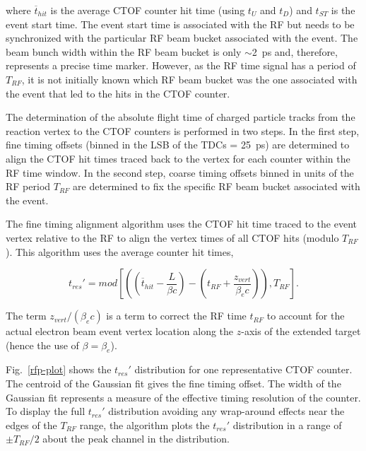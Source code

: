 \documentclass{elsart}
\begin{document}
\noindent
where $\overline{t}_{hit}$ is the average CTOF counter hit time (using $t_U$ and $t_D$) and $t_{ST}$
is the event start time. The event start time is associated with the RF but needs to be synchronized
with the particular RF beam bucket associated with the event. The beam bunch width within the RF beam
bucket is only $\sim$2~ps and, therefore, represents a precise time marker. However, as the RF time
signal has a period of $T_{RF}$, it is not initially known which RF beam bucket was the one associated with
the event that led to the hits in the CTOF counter.

The determination of the absolute flight time of charged particle tracks from the reaction vertex
to the CTOF counters is performed in two steps. In the first step, fine timing offsets (binned in the
LSB of the TDCs = 25~ps) are determined to align the CTOF hit times traced back to the vertex for
each counter within the RF time window. In the second step, coarse timing offsets binned in units of the
RF period $T_{RF}$ are determined to fix the specific RF beam bucket associated with the event.

The fine timing alignment algorithm uses the CTOF hit time traced to the event vertex relative to the RF
to align the vertex times of all CTOF hits (modulo $T_{RF}$). This algorithm uses the average counter hit
times, 

\begin{equation}
t_{res}' = mod \left[ \left( \left(\overline{t}_{hit} - \frac{L}{\beta c} \right) -
\left(t_{RF} + \frac{z_{vert}}{\beta_e c} \right) \right), T_{RF} \right].
\end{equation}

\noindent
The term $z_{vert}/(\beta_e c)$ is a term to correct the RF time $t_{RF}$ to account for the actual
electron beam event vertex location along the $z$-axis of the extended target (hence the use of
$\beta = \beta_e$).

Fig.~\ref{rfp-plot} shows the $t_{res}'$ distribution for one representative CTOF counter. The centroid
of the Gaussian fit gives the fine timing offset. The width of the Gaussian fit represents a measure of the
effective timing resolution of the counter. To display the full $t_{res}'$ distribution avoiding any
wrap-around effects near the edges of the $T_{RF}$ range, the algorithm plots the $t_{res}'$ distribution
in a range of $\pm T_{RF}/2$ about the peak channel in the distribution.
\end{document}
